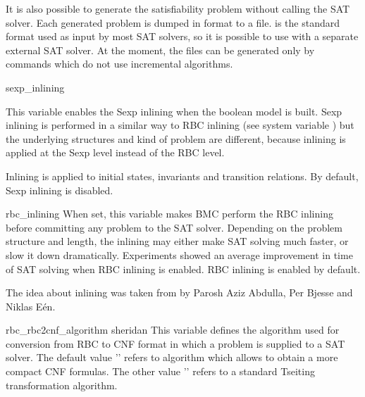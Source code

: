 It is also possible to generate the satisfiability problem without
calling the SAT solver. Each generated problem is dumped in
\dimacs format to a file. \dimacs is the standard format used as input
by most SAT solvers, so it is possible to use \nusmv with a separate
external SAT solver. At the moment, the \dimacs files can be generated only by
commands which do not use incremental algorithms.




\begin{nusmvVar} {sexp\_inlining}{}{}

This variable enables the Sexp inlining when the boolean
model is built. Sexp inlining is performed in a similar way to RBC
inlining (see system variable
) but the underlying
structures and kind of problem are different, because inlining is applied
at the Sexp level instead of the RBC level.

Inlining is applied to initial states, invariants and transition
relations. By default, Sexp inlining is disabled.
\end{nusmvVar}

\begin{nusmvVar} {rbc\_inlining}{}{}
When set, this variable makes BMC perform the RBC inlining before
committing any problem to the SAT solver. Depending on the problem
structure and length, the inlining may either make SAT solving
much faster, or slow it down dramatically.
Experiments showed an average improvement in time of SAT solving
when RBC inlining is enabled. RBC inlining is enabled by default.

The idea about inlining was taken from \cite{abdulla00symbolic} by
Parosh Aziz Abdulla, Per Bjesse and Niklas E\'en.
\end{nusmvVar}

\begin{nusmvVar} {rbc\_rbc2cnf\_algorithm}
{}{sheridan}
%
This variable defines the algorithm used for conversion from RBC to
CNF format in which a problem is supplied to a SAT solver. The default
value '' refers to \cite{DBLP:conf/sat/Sheridan04}
algorithm which allows to obtain a more compact CNF formulas.  The
other value '' refers to a standard Tseiting
transformation algorithm.
\end{nusmvVar}









